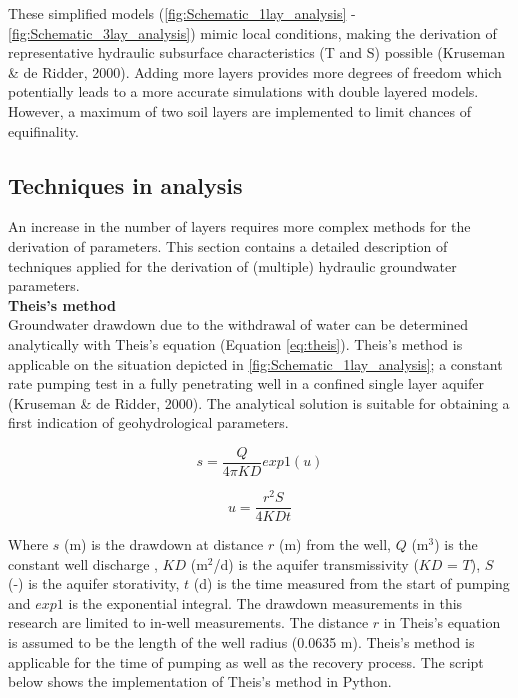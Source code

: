 These simplified models (\ref{fig:Schematic_1lay_analysis} - \ref{fig:Schematic_3lay_analysis}) mimic local conditions, making the derivation of representative hydraulic subsurface characteristics (T and S) possible (Kruseman \& de Ridder, 2000). Adding more layers provides more degrees of freedom which potentially leads to a more accurate simulations with double layered models. However, a maximum of two soil layers are implemented to limit chances of equifinality. \\ 

\subsection{Techniques in analysis}
\label{section:techniques_analysis}
An increase in the number of layers requires more complex methods for the derivation of parameters. This section contains a detailed description of techniques applied for the derivation of (multiple) hydraulic groundwater parameters. \\


\textbf{Theis's method} \\ 
Groundwater drawdown due to the withdrawal of water can be determined analytically with Theis's equation (Equation \ref{eq:theis}). Theis's method is applicable on the situation depicted in \ref{fig:Schematic_1lay_analysis}; a constant rate pumping test in a fully penetrating well in a confined single layer aquifer (Kruseman \& de Ridder, 2000). The analytical solution is suitable for obtaining a first indication of geohydrological parameters.   

\begin{equation}
\label{eq:theis}
 s = \frac{Q}{4\pi K D} exp1(u)
\end{equation}

\begin{equation}
 u = \frac{r^{2} S}{4 K D t}
\end{equation}

Where $s$ (m) is the drawdown at distance $r$ (m) from the well, $Q$ (m$^{3}$) is the constant well discharge , $KD$ (m$^{2}$/d) is the aquifer transmissivity ($KD$ = $T$), $S$ (-) is the aquifer storativity, $t$ (d) is the time measured from the start of pumping and $exp1$ is the exponential integral. The drawdown measurements in this research are limited to in-well measurements. The distance $r$ in Theis's equation is assumed to be the length of the well radius (0.0635 m). Theis's method is applicable for the time of pumping as well as the recovery process. The script below shows the implementation of Theis's method in Python.\\


